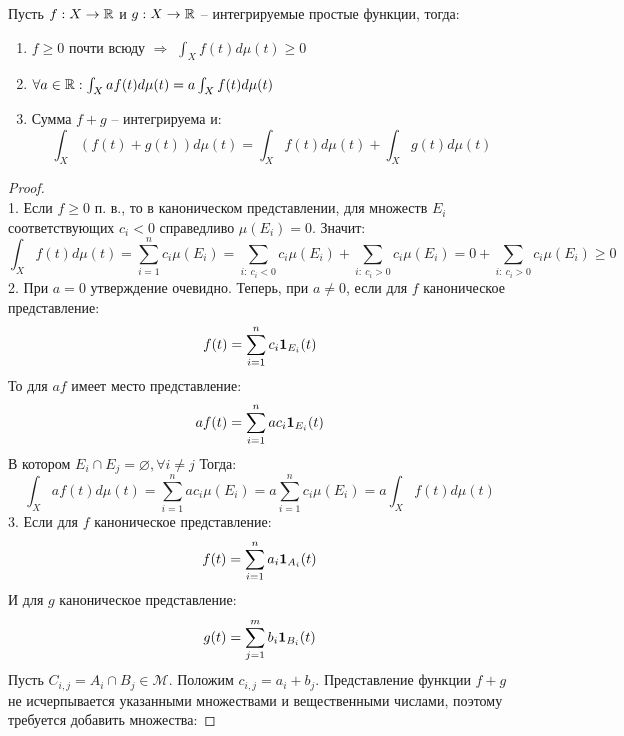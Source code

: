 \documentclass[../main.tex]{subfiles}
\begin{document}
\begin{claim}
	Пусть $f : X \to \mathbb{R}$ и $g : X \to \mathbb{R}$ -- интегрируемые простые функции, тогда:
	\begin{enumerate}
		\item $f \geq 0$ почти всюду $\Rightarrow$ $\int_{X}{f (t) d\mu(t)} \geq 0$
		\item $\forall a \in \mathbb{R} : \int_{X}{a f (t) d\mu (t)} = a \int_{X}{f(t) d\mu(t)}$
		\item Сумма $f + g$ -- интегрируема и:
		$$\int_{X}{(f(t) + g(t))d\mu(t)} = \int_{X}{f(t) d\mu(t)} + \int_{X}{g(t)d\mu(t)}$$
	\end{enumerate}
\end{claim}
\begin{proof}
	$ $ \\
	1. Если $f \geq 0$ п. в., то в каноническом представлении, для множеств $E_i$ соответствующих $c_i < 0$ справедливо $\mu(E_i) = 0$. Значит:
	\begin{equation*}
		\int_{X}{f(t) d\mu(t)} = \sum_{i=1}^{n}{c_i \mu(E_i)} = \sum_{i : \ c_i < 0}{c_i \mu(E_i)} + \sum_{i : \ c_i > 0}{c_i \mu(E_i)} = 0 + \sum_{i : \ c_i > 0}{c_i \mu(E_i)} \geq 0
	\end{equation*}
	2. При $a = 0$ утверждение очевидно. Теперь, при $a \neq 0$, если для $f$ каноническое представление:
	\begin{equation*}
		f(t) = \sum_{i=1}^{n}{c_i \mathbf{1}_{E_i} (t)}
	\end{equation*}
	То для $a f$ имеет место представление:
	\begin{equation*}
		af(t) = \sum_{i=1}^{n}{a c_i \mathbf{1}_{E_i} (t)}
	\end{equation*}
	В котором $E_i \cap E_j = \varnothing, \forall i \neq j$
	Тогда:
	\begin{equation*}
		\int_{X}{a f(t) d\mu(t)} = \sum_{i=1}^{n}{a c_i \mu(E_i)} = a \sum_{i=1}^{n}{c_i \mu(E_i)} = a \int_{X}{f(t) d\mu(t)}
	\end{equation*}
	3. Если для $f$ каноническое представление:
	\begin{equation*}
		f(t) = \sum_{i=1}^{n}{a_i \mathbf{1}_{A_i} (t)}
	\end{equation*}
	И для $g$ каноническое представление:
	\begin{equation*}
		g(t) = \sum_{j=1}^{m}{b_i \mathbf{1}_{B_i} (t)}
	\end{equation*}
	Пусть $C_{i, j} = A_i \cap B_j \in \mathcal{M}$. Положим $c_{i, j} = a_i + b_j$. Представление функции $f + g$ не исчерпывается указанными множествами и вещественными числами, поэтому требуется добавить множества:

\end{proof}
\end{document}
